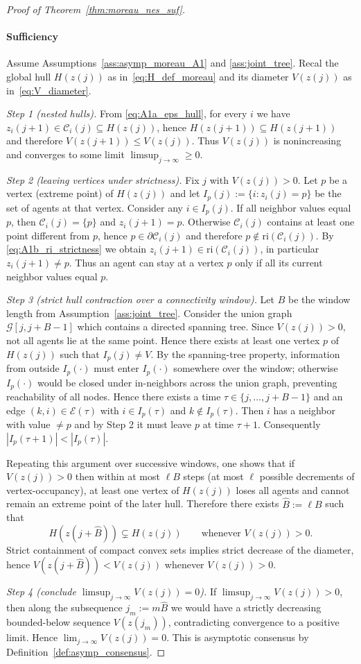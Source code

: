 \documentclass[10pt,a4paper]{amsart}
\def\Cij{\mathcal{C}_i (j)}
\def\ri{\mathrm{ri}}
\begin{document}
\begin{proof}[Proof of Theorem~\ref{thm:moreau_nes_suf}]
\paragraph{Sufficiency}
Assume Assumptions~\ref{ass:asymp_moreau_A1} and \ref{ass:joint_tree}.
Recal the global hull $H(z(j))$ as in~\eqref{eq:H_def_moreau} and its diameter $V(z(j))$ as in~\eqref{eq:V_diameter}.

\emph{Step 1 (nested hulls).} From \eqref{eq:A1a_eps_hull}, for every $i$ we have
$z_i(j+1)\in \Cij\subseteq H(z(j))$, hence $H(z(j+1))\subseteq H(z(j+1))$ and therefore $V(z(j+1))\le V(z(j))$.
Thus $V(z(j))$ is nonincreasing and converges to some limit $\limsup_{j \to \infty} \geq 0$.

\emph{Step 2 (leaving vertices under strictness).} Fix $j$ with $V(z(j))>0$.
Let $p$ be a vertex (extreme point) of $H(z(j))$ and let $I_p(j):=\{i: z_i(j)=p\}$ be the set of agents at that
vertex. Consider any $i\in I_p(j)$.
If all neighbor values equal $p$, then $\Cij=\{p\}$ and $z_i(j+1)=p$.
Otherwise $\Cij$ contains at least one point different from $p$, hence $p\in \partial \Cij$
and therefore $p\notin \ri(\Cij)$. By \eqref{eq:A1b_ri_strictness} we obtain
$z_i(j+1)\in \ri(\Cij)$, in particular $z_i(j+1)\neq p$. Thus an agent can stay at a vertex $p$ only
if all its current neighbor values equal $p$.

\emph{Step 3 (strict hull contraction over a connectivity window).}
Let $B$ be the window length from Assumption~\ref{ass:joint_tree}. Consider the union graph
$\mathcal G[j,j+B-1]$ which contains a directed spanning tree. Since $V(z(j))>0$, not all agents lie at the same
point. Hence there exists at least one vertex $p$ of $H(z(j))$ such that $I_p(j)\neq V$.
By the spanning-tree property, information from outside $I_p(\cdot)$ must enter $I_p(\cdot)$ somewhere over the
window; otherwise $I_p(\cdot)$ would be closed under in-neighbors across the union graph, preventing reachability
of all nodes. Hence there exists a time $\tau\in\{j,\dots,j+B-1\}$ and an edge $(k,i)\in \mathcal E(\tau)$ with
$i\in I_p(\tau)$ and $k\notin I_p(\tau)$. Then $i$ has a neighbor with value $\neq p$ and by Step 2 it must leave
$p$ at time $\tau+1$. Consequently $|I_p(\tau+1)|<|I_p(\tau)|$.

Repeating this argument over successive windows, one shows that if $V(z(j))>0$ then within at most $\ell B$ steps
(at most $\ell$ possible decrements of vertex-occupancy), at least one vertex of $H(z(j))$ loses all agents and
cannot remain an extreme point of the later hull. Therefore there exists $\hat B:=\ell B$ such that
\[
H(z(j+\hat B))\subsetneq H(z(j))\qquad\text{whenever }V(z(j))>0.
\]
Strict containment of compact convex sets implies strict decrease of the diameter, hence
$V(z(j+\hat B))<V(z(j))$ whenever $V(z(j))>0$.

\emph{Step 4 (conclude $\limsup_{j \to \infty} V(z(j))=0$).}
If $\limsup_{j \to \infty} V(z(j))>0$, then along the subsequence $j_m:=m\hat B$ we would have a strictly decreasing bounded-below
sequence $V(z(j_m))$, contradicting convergence to a positive limit. Hence $\lim_{j\to\infty}V(z(j))=0$.
This is asymptotic consensus by Definition~\ref{def:asymp_consensus}.
\end{proof}
\end{document}
